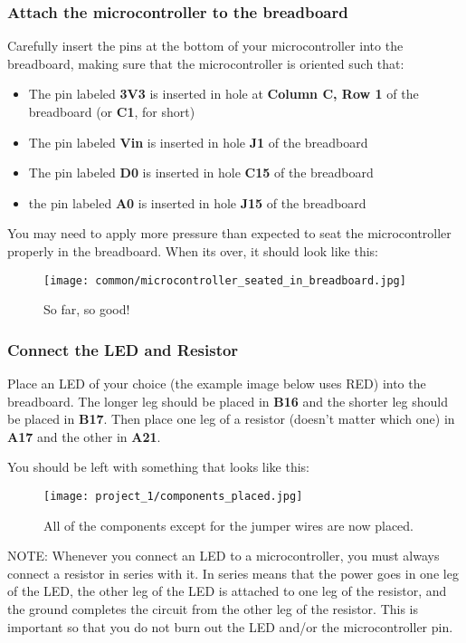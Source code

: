 \subsubsection{Attach the microcontroller to the breadboard}
Carefully insert the pins at the bottom of your microcontroller into the breadboard, making sure that the microcontroller is oriented such that:
\begin{itemize}
    \item The pin labeled \textbf{3V3} is inserted in hole at \textbf{Column C, Row 1} of the breadboard (or \textbf{C1}, for short)
    \item The pin labeled \textbf{Vin} is inserted in hole \textbf{J1} of the breadboard
    \item The pin labeled \textbf{D0} is inserted in hole \textbf{C15} of the breadboard
    \item the pin labeled \textbf{A0} is inserted in hole \textbf{J15} of the breadboard
\end{itemize}
You may need to apply more pressure than expected to seat the microcontroller properly in the breadboard. When its over, it should look like this:

\begin{figure}[H]
    \centering
    \texttt{[image: common/microcontroller\_seated\_in\_breadboard.jpg]}
    \caption{So far, so good!}
\end{figure}

\subsubsection{Connect the LED and Resistor}
Place an LED of your choice (the example image below uses RED) into the breadboard. The longer leg
should be placed in \textbf{B16} and the shorter leg should be placed in \textbf{B17}. Then place one
leg of a resistor (doesn't matter which one) in \textbf{A17} and the other in \textbf{A21}.

You should be left with something that looks like this:
\begin{figure}[H]
    \centering
    \texttt{[image: project\_1/components\_placed.jpg]}
    \caption{All of the components except for the jumper wires are now placed.}
\end{figure}

\begin{tcolorbox}[colback=yellow!10!white,colframe=yellow!50!black]
    NOTE: Whenever you connect an LED to a microcontroller, you must always connect a resistor in series
    with it. In series means that the power goes in one leg of the LED, the other leg of the LED is attached
    to one leg of the resistor, and the ground completes the circuit from the other leg of the resistor.
    This is important so that you do not burn out the LED and/or the microcontroller pin.
\end{tcolorbox}

